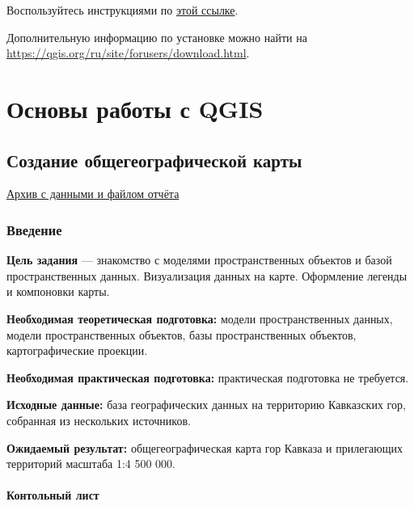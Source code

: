 \documentclass[
  12pt,
]{book}
\begin{document}
Воспользуйтесь инструкциями по \href{https://qgis.org/ru/site/forusers/alldownloads.html\#linux}{этой ссылке}.

Дополнительную информацию по установке можно найти на \url{https://qgis.org/ru/site/forusers/download.html}.

\hypertarget{part-ux43eux441ux43dux43eux432ux44b-ux440ux430ux431ux43eux442ux44b-ux441-qgis}{%
\part{Основы работы с QGIS}\label{part-ux43eux441ux43dux43eux432ux44b-ux440ux430ux431ux43eux442ux44b-ux441-qgis}}

\hypertarget{map-design-general}{%
\chapter{Создание общегеографической карты}\label{map-design-general}}

\href{https://1drv.ms/u/s!AmtmZDq3JgxHgZUGIl2IXikh_JmrhA?e=NdRmIe}{Архив с данными и файлом отчёта}

\hypertarget{map-design-general-intro}{%
\section{Введение}\label{map-design-general-intro}}

\textbf{Цель задания} --- знакомство с моделями пространственных объектов и базой пространственных данных. Визуализация данных на карте. Оформление легенды и компоновки карты.

\textbf{Необходимая теоретическая подготовка:} модели пространственных данных, модели пространственных объектов, базы пространственных объектов, картографические проекции.

\textbf{Необходимая практическая подготовка:} практическая подготовка не требуется.

\textbf{Исходные данные:} база географических данных на территорию Кавказских гор, собранная из нескольких источников.

\textbf{Ожидаемый результат:} общегеографическая карта гор Кавказа и прилегающих территорий масштаба 1:4 500 000.

\hypertarget{map-design-general-checklist}{%
\subsection{Контольный лист}\label{map-design-general-checklist}}
\end{document}
